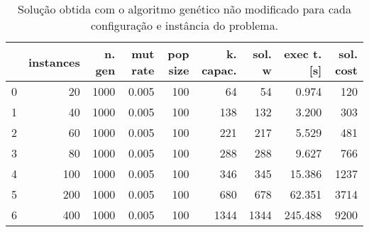 \begin{table}[H]
\centering
\begin{tabular}{lrrrrrrrr}
\toprule
{} &  instances &  n. gen &  mut rate &  pop size &  k. capac. &  sol. w &  exec t. [s] &  sol. cost \\
\midrule
0 &         20 &    1000 &     0.005 &       100 &         64 &      54 &        0.974 &        120 \\
1 &         40 &    1000 &     0.005 &       100 &        138 &     132 &        3.200 &        303 \\
2 &         60 &    1000 &     0.005 &       100 &        221 &     217 &        5.529 &        481 \\
3 &         80 &    1000 &     0.005 &       100 &        288 &     288 &        9.627 &        766 \\
4 &        100 &    1000 &     0.005 &       100 &        346 &     345 &       15.386 &       1237 \\
5 &        200 &    1000 &     0.005 &       100 &        680 &     678 &       62.351 &       3714 \\
6 &        400 &    1000 &     0.005 &       100 &       1344 &    1344 &      245.488 &       9200 \\
\bottomrule
\end{tabular}
\caption{Solução obtida com o algoritmo genético não modificado para cada configuração e instância do problema.}
\label{table:result-vanilla-mutation-05-percent}
\end{table}